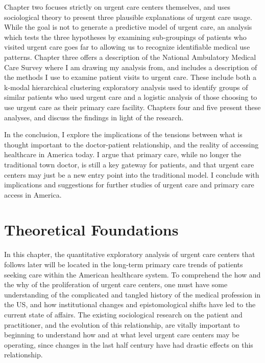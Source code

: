 \documentclass[12pt,twoside]{reedthesis}
\begin{document}
  Chapter two focuses strictly on urgent care centers themselves, and uses
  sociological theory to present three plausible explanations of urgent
  care usage. While the goal is not to generate a predictive model of
  urgent care, an analysis which tests the three hypotheses by examining
  sub-groupings of patients who visited urgent care goes far to allowing
  us to recognize identifiable medical use patterns. Chapter three offers
  a description of the National Ambulatory Medical Care Survey where I am
  drawing my analysis from, and includes a description of the methods I
  use to examine patient visits to urgent care. These include both a
  k-modal hierarchical clustering exploratory analysis used to identify
  groups of similar patients who used urgent care and a logistic analysis
  of those choosing to use urgent care as their primary care facility.
  Chapters four and five present these analyses, and discuss the findings
  in light of the research.
  
  In the conclusion, I explore the implications of the tensions between
  what is thought important to the doctor-patient relationship, and the
  reality of accessing healthcare in America today. I argue that primary
  care, while no longer the traditional town doctor, is still a key
  gateway for patients, and that urgent care centers may just be a new
  entry point into the traditional model. I conclude with implications and
  suggestions for further studies of urgent care and primary care access
  in America.
  
  \chapter*{Theoretical Foundations}\label{theoretical-foundations}
  
  \setcounter{chapter}{2} \setcounter{section}{0} \doublespacing
  
  In this chapter, the quantitative exploratory analysis of urgent care
  centers that follows later will be located in the long-term primary care
  trends of patients seeking care within the American healthcare system.
  To comprehend the how and the why of the proliferation of urgent care
  centers, one must have some understanding of the complicated and tangled
  history of the medical profession in the US, and how institutional
  changes and epistomological shifts have led to the current state of
  affairs. The existing sociological research on the patient and
  practitioner, and the evolution of this relationship, are vitally
  important to beginning to understand how and at what level urgent care
  centers may be operating, since changes in the last half century have
  had drastic effects on this relationship.
  
\end{document}
